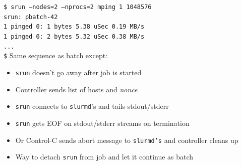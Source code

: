 \documentclass[letter,landscape]{seminar}
\begin{document}
\begin{slide}
  {\tt \$ srun --nodes=2 --nprocs=2 mping 1 1048576}\\
  {\tt srun: pbatch-42}\\
  {\tt 1 pinged   0:        1 bytes      5.38 uSec     0.19 MB/s}\\
  {\tt 1 pinged   0:        2 bytes      5.32 uSec     0.38 MB/s}\\
  {\tt ...}\\
  {\tt \$}
  Same sequence as batch except:
  \begin{itemize}
    \item{{\tt srun} doesn't go away after job is started}
    \item{Controller sends list of hosts and {\em nonce}}
    \item{{\tt srun} connects to {\tt slurmd}'s and tails stdout/stderr}
    \item{{\tt srun} gets EOF on stdout/stderr streams on termination}
    \item{Or Control-C sends abort message to {\tt slurmd's} and
          controller cleans up}
    \item{Way to detach {\tt srun} from job and let it continue as batch}
  \end{itemize}
\end{slide}
\end{document}
